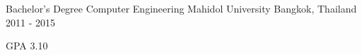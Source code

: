 

\begin{cventries}

  \cventry
    {Bachelor's Degree Computer Engineering} %
    {Mahidol University} %
    {Bangkok, Thailand} %
    {2011 - 2015} %
    {
      \begin{cvitems} %
        \item {GPA 3.10}
      \end{cvitems}
    }
\end{cventries}
